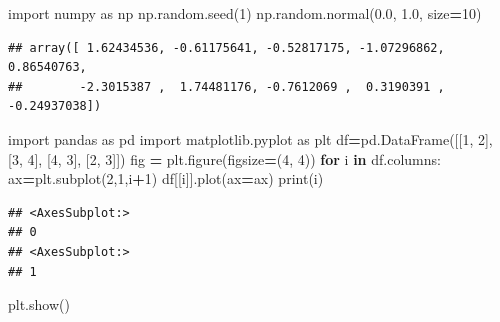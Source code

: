 \documentclass[mstat,12pt]{unswthesis}
\newenvironment{Shaded}{\begin{snugshade}}{\end{snugshade}}
\newcommand{\BuiltInTok}[1]{#1}
\newcommand{\ControlFlowTok}[1]{\textcolor[rgb]{0.13,0.29,0.53}{\textbf{#1}}}
\newcommand{\DecValTok}[1]{\textcolor[rgb]{0.00,0.00,0.81}{#1}}
\newcommand{\FloatTok}[1]{\textcolor[rgb]{0.00,0.00,0.81}{#1}}
\newcommand{\ImportTok}[1]{#1}
\newcommand{\KeywordTok}[1]{\textcolor[rgb]{0.13,0.29,0.53}{\textbf{#1}}}
\newcommand{\NormalTok}[1]{#1}
\newcommand{\OperatorTok}[1]{\textcolor[rgb]{0.81,0.36,0.00}{\textbf{#1}}}
\begin{document}
\begin{Shaded}
\begin{Highlighting}[]
\ImportTok{import}\NormalTok{ numpy }\ImportTok{as}\NormalTok{ np}
\NormalTok{np.random.seed(}\DecValTok{1}\NormalTok{)}
\NormalTok{np.random.normal(}\FloatTok{0.0}\NormalTok{, }\FloatTok{1.0}\NormalTok{, size}\OperatorTok{=}\DecValTok{10}\NormalTok{)}
\end{Highlighting}
\end{Shaded}

\begin{verbatim}
## array([ 1.62434536, -0.61175641, -0.52817175, -1.07296862,  0.86540763,
##        -2.3015387 ,  1.74481176, -0.7612069 ,  0.3190391 , -0.24937038])
\end{verbatim}

\begin{Shaded}
\begin{Highlighting}[]
\ImportTok{import}\NormalTok{ pandas }\ImportTok{as}\NormalTok{ pd}
\ImportTok{import}\NormalTok{ matplotlib.pyplot }\ImportTok{as}\NormalTok{ plt}
\NormalTok{df}\OperatorTok{=}\NormalTok{pd.DataFrame([[}\DecValTok{1}\NormalTok{, }\DecValTok{2}\NormalTok{], [}\DecValTok{3}\NormalTok{, }\DecValTok{4}\NormalTok{], [}\DecValTok{4}\NormalTok{, }\DecValTok{3}\NormalTok{], [}\DecValTok{2}\NormalTok{, }\DecValTok{3}\NormalTok{]])}
\NormalTok{fig }\OperatorTok{=}\NormalTok{ plt.figure(figsize}\OperatorTok{=}\NormalTok{(}\DecValTok{4}\NormalTok{, }\DecValTok{4}\NormalTok{))}
\ControlFlowTok{for}\NormalTok{ i }\KeywordTok{in}\NormalTok{ df.columns:}
\NormalTok{    ax}\OperatorTok{=}\NormalTok{plt.subplot(}\DecValTok{2}\NormalTok{,}\DecValTok{1}\NormalTok{,i}\OperatorTok{+}\DecValTok{1}\NormalTok{) }
\NormalTok{    df[[i]].plot(ax}\OperatorTok{=}\NormalTok{ax)}
    \BuiltInTok{print}\NormalTok{(i)}
\end{Highlighting}
\end{Shaded}

\begin{verbatim}
## <AxesSubplot:>
## 0
## <AxesSubplot:>
## 1
\end{verbatim}

\begin{Shaded}
\begin{Highlighting}[]
\NormalTok{plt.show()}
\end{Highlighting}
\end{Shaded}
\end{document}
